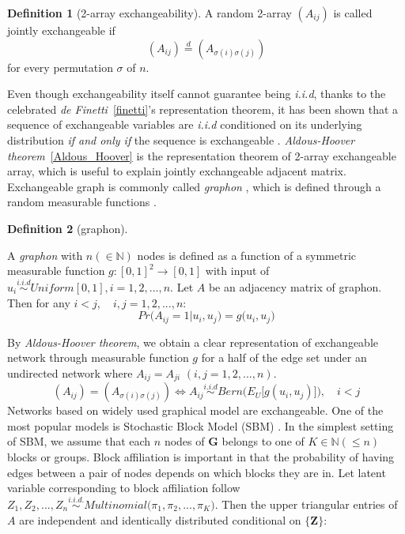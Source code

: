 \documentclass[12pt]{article}
\theoremstyle{definition}
\newtheorem{definition}{Definition}[section]
\begin{document}
\begin{definition}[2-array exchangeability]
	\label{exchangeability}
	A random 2-array $(A_{ij})$ is called jointly exchangeable if 
	$$(A_{ij}) \stackrel{d}{=} (A_{\sigma(i) \sigma(j)})$$
	for every permutation $\sigma$ of $n$.
\end{definition}
Even though exchangeability itself cannot guarantee being \textit{i.i.d}, thanks to the celebrated  \textit{de Finetti}~\ref{finetti}'s representation theorem, it has been shown that a sequence of exchangeable variables are \textit{i.i.d} conditioned on its underlying distribution \textit{if and only if} the sequence is exchangeable \citep{orbanz2015bayesian, caron2014sparse}. \textit{Aldous-Hoover theorem}~\ref{Aldous_Hoover} is the representation theorem of 2-array exchangeable array, which is useful to explain jointly exchangeable adjacent matrix. Exchangeable graph is commonly called \textit{graphon} \citep{lovasz2006limits}, which is defined through a random measurable functions \citep{chan2013estimation}.	
\begin{definition}[graphon]
	\label{graphon}
		
	A \textit{graphon} with $n (\in \mathbb{N})$ nodes is defined as a function of a symmetric measurable function $g : [0,1]^2 \rightarrow [0,1]$ with input of $u_{i} \overset{i.i.d}{\sim} Uniform[0,1], i = 1,2,... ,n$. 
	Let $A$ be an adjacency matrix of graphon. Then for any $i < j, \quad i,j=1,2,...,n$:	
\begin{equation}
	Pr \big(   A_{ij} = 1 \big| u_{i}, u_{j} \big) = g \big(  u_{i}, u_{j} \big)
\end{equation}
\end{definition}
By \textit{Aldous-Hoover theorem}, we obtain a clear representation of exchangeable network through measurable function $g$ for a half of the edge set under an undirected network where $A_{ij} = A_{ji}$  $(i,j=1,2,... , n)$. 	
\begin{equation}
( A_{ij} )  =  (   A_{\sigma(i) \sigma(j)}  ) \Longleftrightarrow A_{ij} \overset{i.i.d}{\sim} Bern\big( E_{U} \big[  g(u_{i}, u_{j})   \big] \big),  \quad i < j
\end{equation}  	
Networks based on  widely used graphical model are exchangeable. One of the most popular models is Stochastic Block Model (SBM) \citep{holland1983stochastic}. In the simplest setting of SBM, we assume that each $n$ nodes of $\mathbf{G}$ belongs to one of $K \in \mathbb{N} (\leq n)$ blocks or groups. Block affiliation is important in that the probability of having edges between a pair of nodes depends on which blocks they are in.  Let latent variable corresponding to block affiliation follow $Z_{1}, Z_{2}, ... , Z_{n} \overset{i.i.d.}{\sim} Multinomial\big( \pi_{1}, \pi_{2}, ... , \pi_{K} \big)$. Then the upper triangular entries of $A$ are independent and identically distributed conditional on $\{\mathbf{Z}\}$:
\end{document}
